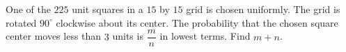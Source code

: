One of the $225$ unit squares in a $15$ by $15$ grid is chosen uniformly. The grid is rotated $90^\circ$ clockwise about its center. The probability that the chosen square center moves less than $3$ units is $\dfrac{m}{n}$ in lowest terms. Find $m+n$.
